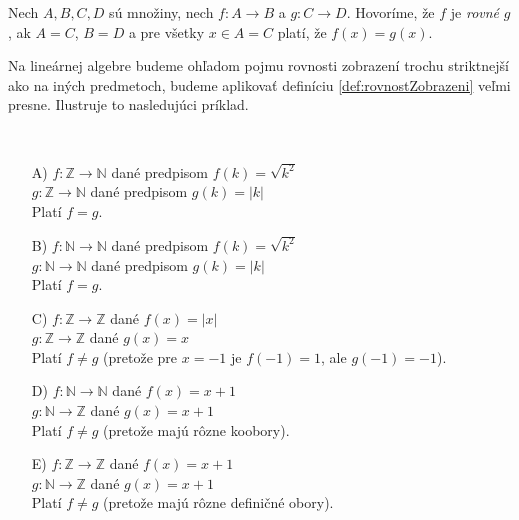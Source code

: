 \begin{definition}\label{def:rovnostZobrazeni}
Nech $A, B, C, D$ sú množiny, nech $f \colon A \rightarrow B$ a $g \colon C \rightarrow D$.
Hovoríme, že $f$ je \emph{rovné} $g$, ak $A=C$, $B=D$ a pre všetky $x \in A=C$ platí, že $f(x)=g(x)$.
\end{definition}

Na lineárnej algebre budeme ohľadom pojmu rovnosti zobrazení trochu striktnejší ako
na iných predmetoch, budeme aplikovať definíciu \ref{def:rovnostZobrazeni} veľmi
presne.
Ilustruje to nasledujúci príklad.

\begin{example}\label{ex:rovnostZobrazeni}
~\par
\begin{enumerate}
    \item[A)] $f \colon \mathbb{Z} \rightarrow \mathbb{N}$ dané predpisom $f(k) = \sqrt{k^2}$ \\
    $g \colon \mathbb{Z} \rightarrow \mathbb{N}$ dané predpisom $g(k) = |k|$ \\
    Platí $f=g$.
    \item[B)] $f \colon \mathbb{N} \rightarrow \mathbb{N}$ dané predpisom $f(k) = \sqrt{k^2}$ \\
    $g \colon \mathbb{N} \rightarrow \mathbb{N}$ dané predpisom $g(k) = |k|$ \\
    Platí $f=g$.
    \item[C)] $f \colon \mathbb{Z} \rightarrow \mathbb{Z}$ dané $f(x) = |x|$ \\
    $g \colon \mathbb{Z} \rightarrow \mathbb{Z}$ dané $g(x) = x$ \\
    Platí $f \neq g$ (pretože pre $x=-1$ je $f(-1)=1$, ale $g(-1)=-1$).
    \item[D)] $f \colon \mathbb{N} \rightarrow \mathbb{N}$ dané $f(x) = x+1$ \\
    $g \colon \mathbb{N} \rightarrow \mathbb{Z}$ dané $g(x) = x+1$ \\
    Platí $f \neq g$ (pretože majú rôzne koobory).
    \item[E)] $f \colon \mathbb{Z} \rightarrow \mathbb{Z}$ dané $f(x) = x+1$ \\
    $g \colon \mathbb{N} \rightarrow \mathbb{Z}$ dané $g(x) = x+1$ \\
    Platí $f \neq g$ (pretože majú rôzne definičné obory).
\end{enumerate}
\end{example}

